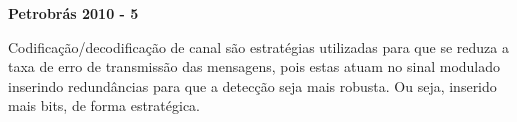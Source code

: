 \textbf{Petrobrás 2010 - 5}

Codificação/decodificação de canal são estratégias utilizadas para que se reduza a taxa de erro de transmissão das mensagens, pois estas atuam no sinal modulado inserindo redundâncias para que a detecção seja mais robusta. Ou seja, inserido mais bits, de forma estratégica.